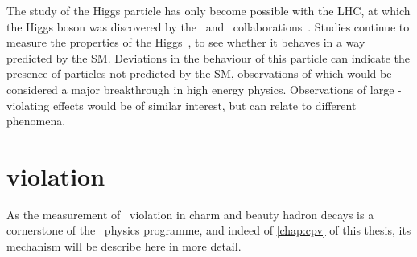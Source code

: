 The study of the Higgs particle has only become possible with the \ac{LHC}, at 
which the Higgs boson was discovered by the \atlas\ and \cms\ 
collaborations~\cite{Aad:2012tfa,Chatrchyan:2012xdj}.
Studies continue to measure the properties of the 
Higgs~\cite{Khachatryan:2016vau}, to see whether it behaves in a way predicted 
by the \ac{SM}.
Deviations in the behaviour of this particle can indicate the presence of 
particles not predicted by the \ac{SM}, observations of which would be 
considered a major breakthrough in high energy physics.
Observations of large \CP-violating effects would be of similar interest, but 
can relate to different phenomena.

\section{\texorpdfstring{\CP}{CP} violation}
\label{chap:intro:sm:cp}

As the measurement of \CP\ violation in charm and beauty hadron decays is a 
cornerstone of the \lhcb\ physics programme, and indeed of \cref{chap:cpv} of 
this thesis, its mechanism will be describe here in more detail.

